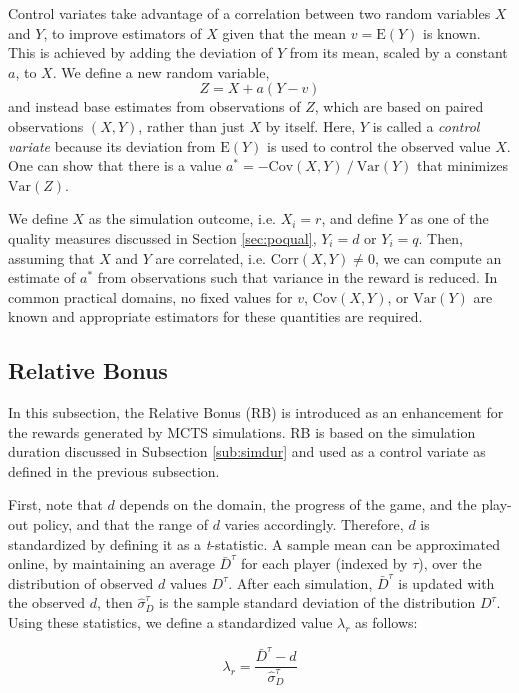 \documentclass{ecai2014}
\newcommand{\E}[1]{\mathrm{E}\left( #1 \right)}
\newcommand{\Var}[1]{\mathrm{Var}\left( #1 \right)}
\newcommand{\Cov}[1]{\mathrm{Cov}\left( #1 \right)}
\newcommand{\Corr}[1]{\mathrm{Corr}\left( #1 \right)}
\begin{document}
Control variates take advantage of a correlation between two random variables $X$ and $Y$, to improve estimators of $X$ given that the mean $v=\E{Y}$ is known. This is achieved by adding the deviation of $Y$ from its mean, scaled by a constant $a$, to $X$. We define a new random variable, 
\begin{equation}
Z=X+a\left(Y-v\right)
\label{eq:cv}
\end{equation}
and instead base estimates from observations of $Z$, which are based on paired observations $(X,Y)$, rather than just $X$ by itself. 
Here, $Y$ is called a {\it control variate} because its deviation from $\E{Y}$ is used to control the observed value $X$. 
One can show that there is a value $a^*=-\Cov{X,Y}\mathbin{/}\Var{Y}$ that minimizes $\Var{Z}$.

We define $X$ as the simulation outcome, i.e. $X_i=r$, and define $Y$ as one of the quality measures discussed in Section \ref{sec:poqual}, $Y_i=d$ or $Y_i=q$. Then, assuming that $X$ and $Y$ are correlated, i.e. $\Corr{X,Y}\neq0$, we can compute an estimate of  $a^*$ from observations such that variance in the reward is reduced. In common practical domains, no fixed values for $v$, $\Cov{X,Y}$, or $\Var{Y}$ are known and appropriate estimators for these quantities are required.

\subsection{Relative Bonus}
\label{subsec:rb}
In this subsection, the Relative Bonus (RB) is introduced as an enhancement for the rewards generated by MCTS simulations. RB is based on the simulation duration discussed in Subsection \ref{sub:simdur} and used as a control variate as defined in the previous subsection.

First, note that $d$ depends on the domain, the progress of the game, and the play-out policy, and that the range of $d$ varies accordingly. Therefore, $d$ is standardized by defining it as a \emph{t}-statistic. A sample mean can be approximated online, by maintaining an average $\bar{D}^\tau$ for each player (indexed by $\tau$), over the distribution of observed $d$ values $D^\tau$. After each simulation, $\bar{D}^\tau$ is updated with the observed $d$, then $\hat{\sigma}^\tau_D$ is the sample standard deviation of the distribution $D^\tau$. Using these statistics, we define a standardized value $\lambda_r$ as follows:

\begin{equation}
\lambda_r = \frac{\bar{D}^\tau - d}{\hat{\sigma}^\tau_D}
\label{eq:rb_norm}
\end{equation}
\end{document}
